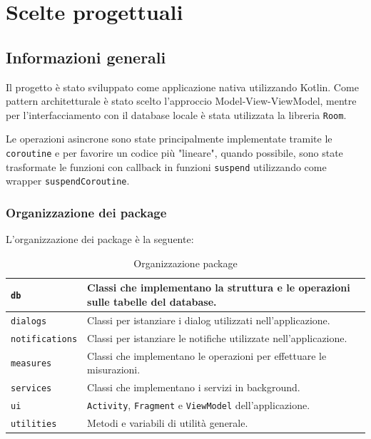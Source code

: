 \documentclass[11pt]{article}
\begin{document}
\section{Scelte progettuali}

\subsection{Informazioni generali}
Il progetto è stato sviluppato come applicazione nativa utilizzando Kotlin. 
Come pattern architetturale è stato scelto l'approccio Model-View-ViewModel, mentre per l'interfacciamento con il database locale è stata utilizzata la libreria \texttt{Room}.

Le operazioni asincrone sono state principalmente implementate tramite le \texttt{coroutine} e per favorire un codice più "lineare", quando possibile, sono state trasformate le funzioni con callback in funzioni \texttt{suspend} utilizzando come wrapper \texttt{suspendCoroutine}.

\subsubsection{Organizzazione dei package}
L'organizzazione dei package è la seguente:
\begin{table}[H]
  \centering
  \begin{tabular}{ | m{8em} | m{10cm} | } 
    \hline
    \texttt{db} & Classi che implementano la struttura e le operazioni sulle tabelle del database. \\ 
    \hline
    \texttt{dialogs} & Classi per istanziare i dialog utilizzati nell'applicazione. \\ 
    \hline
    \texttt{notifications} & Classi per istanziare le notifiche utilizzate nell'applicazione. \\ 
    \hline
    \texttt{measures} & Classi che implementano le operazioni per effettuare le misurazioni. \\ 
    \hline
    \texttt{services} & Classi che implementano i servizi in background. \\ 
    \hline
    \texttt{ui} & \texttt{Activity}, \texttt{Fragment} e \texttt{ViewModel} dell'applicazione. \\ 
    \hline
    \texttt{utilities} & Metodi e variabili di utilità generale. \\ 
    \hline
  \end{tabular}
  \caption{Organizzazione package}\label{table:packages}
\end{table}
\end{document}
